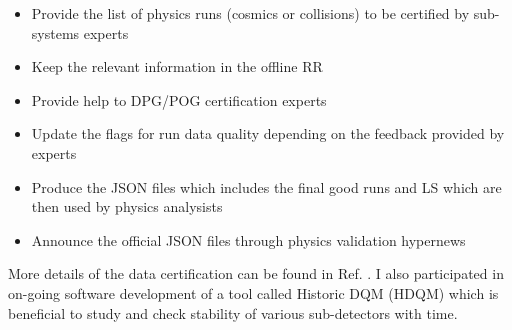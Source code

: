 \begin{itemize}
\item Provide the list of physics runs (cosmics or collisions) to be certified by sub-systems experts
\item Keep the relevant information in the offline RR
\item Provide help to DPG/POG certification experts
\item Update the flags for run data quality depending on the feedback provided by experts
\item Produce the JSON files which includes the final good runs and LS which are then used by physics analysists
\item Announce the official JSON files through physics validation hypernews 
\end{itemize}

More details of the data certification can be found in Ref. \cite{DC}. I also participated in on-going software development of a tool called Historic DQM (HDQM) which is beneficial to study and check stability of various sub-detectors with time.


